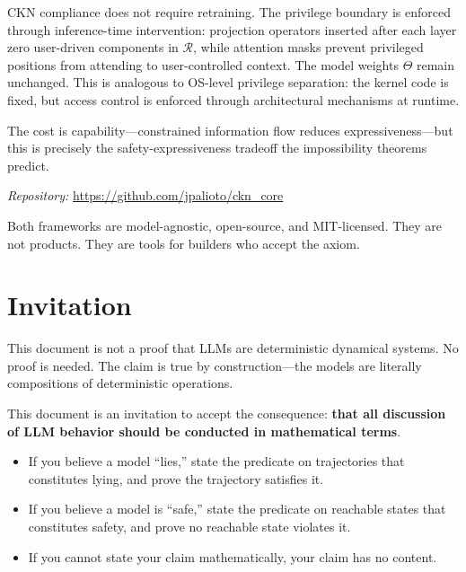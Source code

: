 \documentclass[11pt]{article}
\theoremstyle{definition}
\theoremstyle{remark}
\begin{document}
CKN compliance does not require retraining. The privilege boundary is enforced through inference-time intervention: projection operators inserted after each layer zero user-driven components in $\mathcal{R}$, while attention masks prevent privileged positions from attending to user-controlled context. The model weights $\Theta$ remain unchanged. This is analogous to OS-level privilege separation: the kernel code is fixed, but access control is enforced through architectural mechanisms at runtime.

The cost is capability---constrained information flow reduces expressiveness---but this is precisely the safety-expressiveness tradeoff the impossibility theorems predict.

\smallskip
\noindent\textit{Repository:} \url{https://github.com/jpalioto/ckn_core}

\bigskip

Both frameworks are model-agnostic, open-source, and MIT-licensed. They are not products. They are tools for builders who accept the axiom.

\section{Invitation}

This document is not a proof that LLMs are deterministic dynamical systems. No proof is needed. The claim is true by construction---the models are literally compositions of deterministic operations.

This document is an invitation to accept the consequence: \textbf{that all discussion of LLM behavior should be conducted in mathematical terms}.

\begin{itemize}[topsep=0.5em, itemsep=0.5em, leftmargin=1.5em]
    \item If you believe a model ``lies,'' state the predicate on trajectories that constitutes lying, and prove the trajectory satisfies it.
    
    \item If you believe a model is ``safe,'' state the predicate on reachable states that constitutes safety, and prove no reachable state violates it.
    
    \item If you cannot state your claim mathematically, your claim has no content.
\end{itemize}
\end{document}
